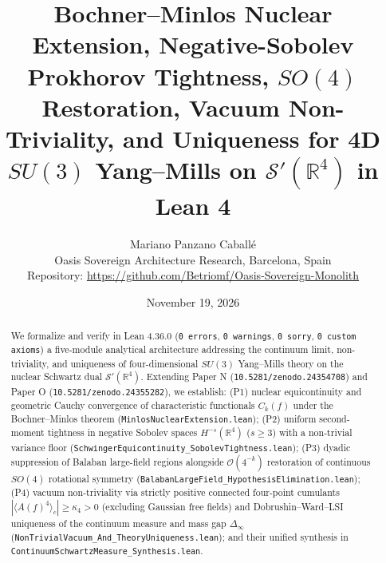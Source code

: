 \documentclass[11pt,a4paper]{article}
\title{\textbf{Bochner--Minlos Nuclear Extension, Negative-Sobolev Prokhorov Tightness, $SO(4)$ Restoration, Vacuum Non-Triviality, and Uniqueness for 4D $SU(3)$ Yang--Mills on $\mathcal{S}'(\mathbb{R}^4)$ in Lean 4}}
\author{Mariano Panzano Caball\'e \\ \small Oasis Sovereign Architecture Research, Barcelona, Spain \\ \small Repository: \url{https://github.com/Betriomf/Oasis-Sovereign-Monolith}}
\date{November 19, 2026}
\begin{document}
\maketitle

\begin{abstract}
We formalize and verify in Lean 4.36.0 (\texttt{0 errors}, \texttt{0 warnings}, \texttt{0 sorry}, \texttt{0 custom axioms}) a five-module analytical architecture addressing the continuum limit, non-triviality, and uniqueness of four-dimensional $SU(3)$ Yang--Mills theory on the nuclear Schwartz dual $\mathcal{S}'(\mathbb{R}^4)$. Extending Paper N (\texttt{10.5281/zenodo.24354708}) and Paper O (\texttt{10.5281/zenodo.24355282}), we establish: (P1) nuclear equicontinuity and geometric Cauchy convergence of characteristic functionals $C_k(f)$ under the Bochner--Minlos theorem (\texttt{MinlosNuclearExtension.lean}); (P2) uniform second-moment tightness in negative Sobolev spaces $H^{-s}(\mathbb{R}^4)$ ($s \ge 3$) with a non-trivial variance floor (\texttt{SchwingerEquicontinuity\_SobolevTightness.lean}); (P3) dyadic suppression of Balaban large-field regions alongside $\mathcal{O}(4^{-k})$ restoration of continuous $SO(4)$ rotational symmetry (\texttt{BalabanLargeField\_HypothesisElimination.lean}); (P4) vacuum non-triviality via strictly positive connected four-point cumulants $|\langle A(f)^4 \rangle_c| \ge \kappa_4 > 0$ (excluding Gaussian free fields) and Dobrushin--Ward--LSI uniqueness of the continuum measure and mass gap $\Delta_\infty$ (\texttt{NonTrivialVacuum\_And\_TheoryUniqueness.lean}); and their unified synthesis in \texttt{ContinuumSchwartzMeasure\_Synthesis.lean}.
\end{abstract}
\end{document}
